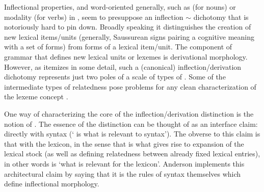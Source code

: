 \documentclass[output=paper,
modfonts
]{LSP/langsci}
\begin{document}
Inflectional properties, and word-oriented  generally, such as  (for nouns) or modality (for verbs) in , seem to presuppose an inflection $\sim$  dichotomy that is notoriously hard to pin down. Broadly speaking it distinguishes the creation of new lexical items/units (generally, Saussurean signs pairing a cognitive meaning with a set of forms) from forms of a lexical item/unit. The component of grammar that defines new lexical units or lexemes is derivational morphology. However,  as \citet{Spencer13:book} %
itemizes in some detail, such a (canonical) inflection/derivation dichotomy represents just two poles of a scale of types of . 
Some of the intermediate types of relatedness pose problems for any clean characterization of the lexeme concept 
\parencite[part of the problem of ``'',][]{Spencer16:individuating}.

 One way of characterizing the core of the inflection/derivation distinction is the notion of  	\parencite[][and subsequent references]{AndersonSR82}.
 The essence of the distinction can be thought of as an interface claim:   directly with syntax (\textquoteleft {} is what is relevant to syntax\textquoteright). The obverse to this claim is that   with the lexicon, in the sense that  is what gives rise to expansion of the lexical stock (as well as defining relatedness between already fixed lexical entries), in other words  is \textquoteleft what is relevant for the lexicon\textquoteright. Anderson implements this architectural claim by saying that it is the rules of syntax themselves which define inflectional morphology. 
  
\end{document}
